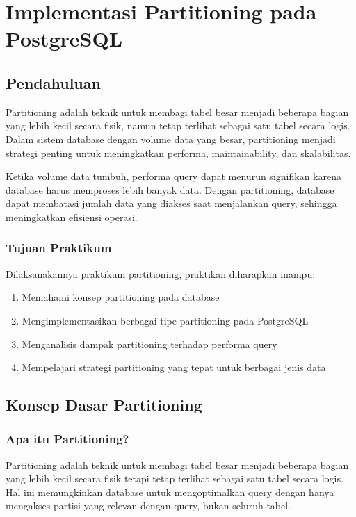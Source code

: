 \chapter*{Implementasi Partitioning pada PostgreSQL}
\section{Pendahuluan}
Partitioning adalah teknik untuk membagi tabel besar menjadi beberapa bagian yang lebih kecil secara fisik, namun tetap terlihat sebagai satu tabel secara logis. Dalam sistem database dengan volume data yang besar, partitioning menjadi strategi penting untuk meningkatkan performa, maintainability, dan skalabilitas.

Ketika volume data tumbuh, performa query dapat menurun signifikan karena database harus memproses lebih banyak data. Dengan partitioning, database dapat membatasi jumlah data yang diakses saat menjalankan query, sehingga meningkatkan efisiensi operasi.

\subsection{Tujuan Praktikum}
Dilaksanakannya praktikum partitioning, praktikan diharapkan mampu:
\begin{enumerate}
    \item Memahami konsep partitioning pada database
    \item Mengimplementasikan berbagai tipe partitioning pada PostgreSQL
    \item Menganalisis dampak partitioning terhadap performa query
    \item Mempelajari strategi partitioning yang tepat untuk berbagai jenis data
\end{enumerate}

\section{Konsep Dasar Partitioning}

\subsection{Apa itu Partitioning?}
Partitioning adalah teknik untuk membagi tabel besar menjadi beberapa bagian yang lebih kecil secara fisik tetapi tetap terlihat sebagai satu tabel secara logis. Hal ini memungkinkan database untuk mengoptimalkan query dengan hanya mengakses partisi yang relevan dengan query, bukan seluruh tabel.

